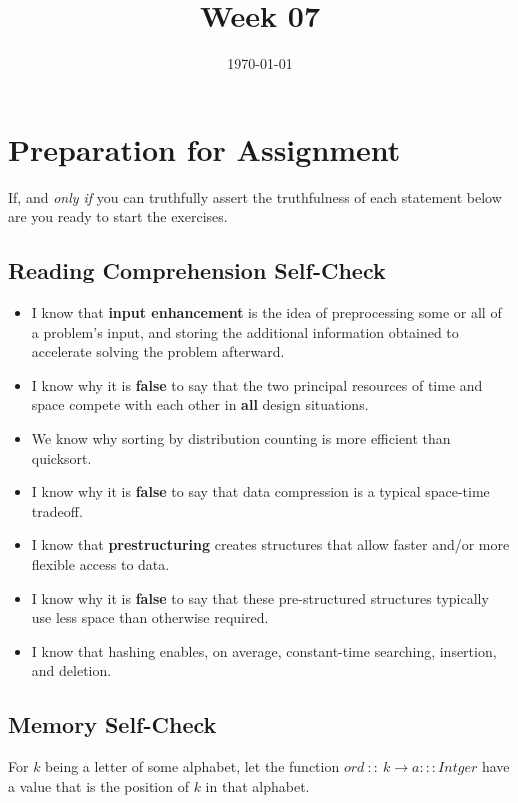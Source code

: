 \documentclass[12pt]{amsart}
\title{Week 07}
\date{\today}
\begin{document}
\maketitle

\section{Preparation for Assignment}
If, and \textit{only if} you can truthfully assert the truthfulness of each statement below are you ready to start the exercises.
\subsection {Reading Comprehension Self-Check}
\begin{itemize}
\item I know that \textbf{input enhancement} is the idea of preprocessing some or all of a problem\textquoteright s input, and storing the additional information obtained to accelerate solving the problem afterward.
 \item I know why it is \textbf{false} to say that the two principal resources of
    time and space compete with each other in \textbf{all} design situations.
 \item We know why sorting by distribution counting is more efficient than
    quicksort.
 \item I know why it is \textbf{false} to say that data compression is a typical
    space-time tradeoff.
 \item I know that \textbf{prestructuring} creates structures that allow faster
    and/or more flexible access to data.
 \item I know why it is \textbf{false} to say that these pre-structured structures
    typically use less space than otherwise required.
 \item I know that hashing enables, on average, constant-time searching,
    insertion, and deletion.

\end{itemize}
\subsection{Memory Self-Check}
For $k$ being a letter of some alphabet, let the function $ord\ ::\ k\rightarrow a:::Intger$ have a value that is the position of $k$ in that alphabet.
 
\end{document}
